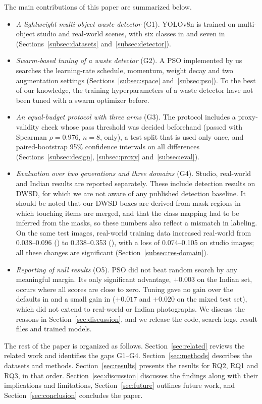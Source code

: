 The main contributions of this paper are summarized below.
\begin{itemize}
\item \textit{A lightweight multi-object waste detector} (G1). YOLOv8n is trained on multi-object studio and real-world scenes, with six classes in \genone and seven in \gentwo (Sections~\ref{subsec:datasets} and~\ref{subsec:detector}).
\item \textit{Swarm-based tuning of a waste detector} (G2). A PSO implemented by us searches the learning-rate schedule, momentum, weight decay and two augmentation settings (Sections~\ref{subsec:space} and~\ref{subsec:pso}). To the best of our knowledge, the training hyperparameters of a waste detector have not been tuned with a swarm optimizer before.
\item \textit{An equal-budget protocol with three arms} (G3). The protocol includes a proxy-validity check whose pass threshold was decided beforehand (passed with Spearman $\rho = 0.976$, $n = 8$, \genone only), a test split that is used only once, and paired-bootstrap 95\% confidence intervals on all differences (Sections~\ref{subsec:design}, \ref{subsec:proxy} and~\ref{subsec:eval}).
\item \textit{Evaluation over two generations and three domains} (G4). Studio, real-world and Indian results are reported separately. These include detection results on DWSD, for which we are not aware of any published detection baseline. It should be noted that our DWSD boxes are derived from mask regions in which touching items are merged, and that the class mapping had to be inferred from the masks, so these numbers also reflect a mismatch in labeling. On the same test images, real-world training data increased real-world \mapfifty from 0.038--0.096 (\genone) to 0.338--0.353 (\gentwo), with a loss of 0.074--0.105 on studio images; all these changes are significant (Section~\ref{subsec:res-domain}).
\item \textit{Reporting of null results} (O5). PSO did not beat random search by any meaningful margin. Its only significant advantage, $+0.003$ \mapfifty on the Indian set, occurs where all scores are close to zero. Tuning gave no gain over the defaults in \genone and a small gain in \gentwo ($+0.017$ and $+0.020$ on the mixed test set), which did not extend to real-world or Indian photographs. We discuss the reasons in Section~\ref{sec:discussion}, and we release the code, search logs, result files and trained models.
\end{itemize}

The rest of the paper is organized as follows. Section~\ref{sec:related} reviews the related work and identifies the gaps G1--G4. Section~\ref{sec:methods} describes the datasets and methods. Section~\ref{sec:results} presents the results for RQ2, RQ1 and RQ3, in that order. Section~\ref{sec:discussion} discusses the findings along with their implications and limitations, Section~\ref{sec:future} outlines future work, and Section~\ref{sec:conclusion} concludes the paper.

